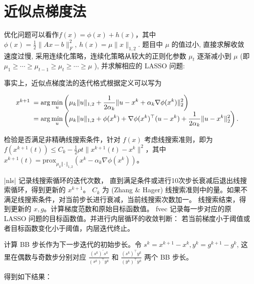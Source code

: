 \documentclass[12pt]{article}
\begin{document}
	

	
	
	\section{近似点梯度法}
	
优化问题可以看作$f(x) = \phi(x) + h(x)$，其中$ \phi(x) = \frac{1}{2}\|A x-b\|_F^2, \ h(x) =\mu\|x\|_{1,2}$.
题目中 $\mu$ 的值过小, 直接求解收敛速度过慢, 采用连续化策略，连续化策略从较大的正则化参数 $\mu_t$ 逐渐减小到 $\mu$ (即 $\mu_1 \geq \cdots \geq \mu_{t-1} \geq \mu_t \geq \cdots \geq \mu$ ), 并求解相应的 LASSO 问题:

  事实上，近似点梯度法的迭代格式根据定义可以写为 

 $$ \begin{array}{ll} x^{k+1}&\hspace{-0.5em}=\displaystyle\arg\min_u
	 \left(  \mu_k \|u\|_{1,2}+\frac{1}{2 \alpha_k}\|u-x^k+ \alpha_k\nabla \phi(x^k)\|_2^2 \right)  \\
	 &\hspace{-0.5em}=\displaystyle\arg\min_u \left(   \mu_k  \|u\|_{1,2}+\phi(x^k)
	 +\nabla \phi(x^k)^\top (u-x^k)+\frac{1}{2 \alpha_k}\|u-x^k\|^2_2 \right).
	 \end{array} $$

 检验是否满足非精确线搜索条件，针对 $f(x)$ 考虑线搜索准则，即为 $f(x^{k+1}(t))\le C_k - \frac{1}{2}\rho t
 \| x^{k+1}(t)-x^k\|^2$，其中 $x^{k+1}(t) = \mathrm{prox}_{\mu_k \Vert \cdot \Vert_{1,2}}(x^k -\alpha_k \nabla \phi(x^k))$。 

 |nls| 记录线搜索循环的迭代次数，
 直到满足条件或进行10次步长衰减后退出线搜索循环，得到更新的 $x^{k+1}$。 $C_k$ 为 (Zhang \&
 Hager) 线搜索准则中的量。如果不满足线搜索条件，对当前步长进行衰减，当前线搜索次数加一。
 线搜索结束，得到更新的 $x, g$。计算梯度范数和原始目标函数值。 fvec 记录每一步对应的原 LASSO 问题的目标函数值。并进行内层循环的收敛判断： 若当前梯度小于阈值或者目标函数变化小于阈值，内层迭代终止。
 
 计算 BB 步长作为下一步迭代的初始步长。令 $s^k=x^{k+1}-x^k, y^k=g^{k+1}-g^k$, 这里在偶数与奇数步分别对应 $\frac{\left(s^k\right)^{\prime} s^k}{\left(s^k\right)^{\top} y^k}$ 和 $\frac{\left(s^k\right)^{\top} y^k}{\left(y^k\right)^{\top} y^k}$ 两个 BB 步长。
 
 得到如下结果：
 
\end{document}
